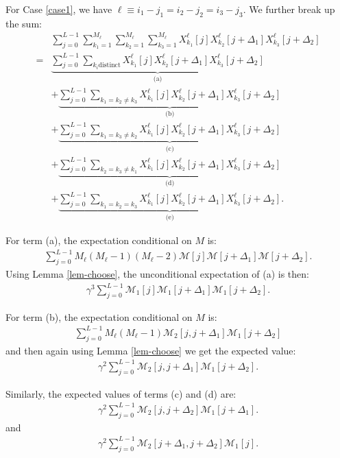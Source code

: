 \documentclass[12pt]{article}
\newcommand{\1}{\mathbf{1}}
\newcommand{\M}{\mathcal{M}}
\theoremstyle{plain}
\theoremstyle{definition}
\theoremstyle{remark}
\theoremstyle{plain}
\theoremstyle{remark}
\theoremstyle{plain}
\theoremstyle{plain}
\theoremstyle{plain}
\numberwithin{equation}{section}
\begin{document}
For Case \ref{case1}, we have $\ell \equiv i_1 - j_1 = i_2 - j_2 = i_3 - j_3$. We further break up the sum:
%
\begin{align}
%
&\sum_{j=0}^{L-1} \sum_{k_1=1}^{M_\ell} \sum_{k_2=1}^{M_\ell} \sum_{k_3=1}^{M_\ell} 
X_{k_1}^{\ell}[j] X_{k_2}^{\ell}[j + \Delta_1] X_{k_3}^{\ell}[j + \Delta_2]
\nonumber \\
=& \underbrace{ \sum_{j=0}^{L-1} \sum_{k_i \text{distinct}} 
	X_{k_1}^{\ell}[j] X_{k_2}^{\ell}[j + \Delta_1] X_{k_3}^{\ell}[j + \Delta_2]
}_{\text{(a)}}
\nonumber \\
&+\underbrace{ \sum_{j=0}^{L-1} \sum_{k_1=k_2\ne k_3} 
	X_{k_1}^{\ell}[j] X_{k_2}^{\ell}[j + \Delta_1] X_{k_3}^{\ell}[j + \Delta_2]
}_{\text{(b)}}
\nonumber \\
&+\underbrace{ \sum_{j=0}^{L-1} \sum_{k_1=k_3\ne k_2} 
	X_{k_1}^{\ell}[j] X_{k_2}^{\ell}[j + \Delta_1] X_{k_3}^{\ell}[j + \Delta_2]
}_{\text{(c)}}
\nonumber \\
&+\underbrace{ \sum_{j=0}^{L-1} \sum_{k_2=k_3\ne k_1} 
	X_{k_1}^{\ell}[j] X_{k_2}^{\ell}[j + \Delta_1] X_{k_3}^{\ell}[j + \Delta_2]
}_{\text{(d)}}
\nonumber \\
&+\underbrace{ \sum_{j=0}^{L-1} \sum_{k_1=k_2=k_3} 
	X_{k_1}^{\ell}[j] X_{k_2}^{\ell}[j + \Delta_1] X_{k_3}^{\ell}[j + \Delta_2]
}_{\text{(e)}}.
%
\end{align}

For term (a), the expectation conditional on $M$ is:
%
\begin{align}
%
\sum_{j=0}^{L-1} M_\ell(M_\ell-1)(M_\ell-2)\M[j] \M[j+\Delta_1] \M[j+\Delta_2].
%
\end{align}
%
Using Lemma \ref{lem-choose}, the unconditional expectation of (a) is then:
%
\begin{align} \label{aaaa}
%
\gamma^3 \sum_{j=0}^{L-1} \M_1[j] \M_1[j+\Delta_1] \M_1[j+\Delta_2].
%
\end{align}


For term (b), the expectation conditional on $M$ is:
%
\begin{align}
%
\sum_{j=0}^{L-1} M_\ell (M_\ell - 1) \M_2[j,j+\Delta_1] \M_1[j + \Delta_2]
%
\end{align}
%
and then again using Lemma \ref{lem-choose} we get the expected value:
%
\begin{align} \label{bbbb}
%
\gamma^2 \sum_{j=0}^{L-1} \M_2[j,j+\Delta_1] \M_1[j+\Delta_2].
%
\end{align}

Similarly, the expected values of terms (c) and (d) are:
%
\begin{align} \label{cccc}
%
\gamma^2 \sum_{j=0}^{L-1} \M_2[j,j+\Delta_2] \M_1[j+\Delta_1].
%
\end{align}
%
and
%
\begin{align} \label{dddd}
%
\gamma^2 \sum_{j=0}^{L-1} \M_2[j+\Delta_1,j+\Delta_2] \M_1[j].
%
\end{align}
\end{document}
